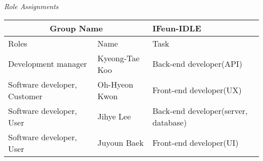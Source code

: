 \documentclass[landscape,twocolumn, letterpaper]{scrartcl}
\begin{document}
    \begin{center}
    \textit{Role Assignments}
    \begin{tabular}{|p{3cm}|p{2cm}|p{3cm}|}
    \hline
    \multicolumn{2}{|c|}{Group Name} & IFeun-IDLE \\
    \hline
      Roles & Name & Task\\
    \hline
      Development manager & Kyeong-Tae Koo & Back-end developer(API) \\
    \hline
      Software developer, Customer & Oh-Hyeon Kwon & Front-end developer(UX)\\
    \hline
      Software developer, User & Jihye Lee & Back-end developer(server, database)\\
    \hline
      Software developer, User & Juyoun Baek & Front-end developer(UI)\\
    \hline
    \end{tabular}
    \end{center}
\end{document}
